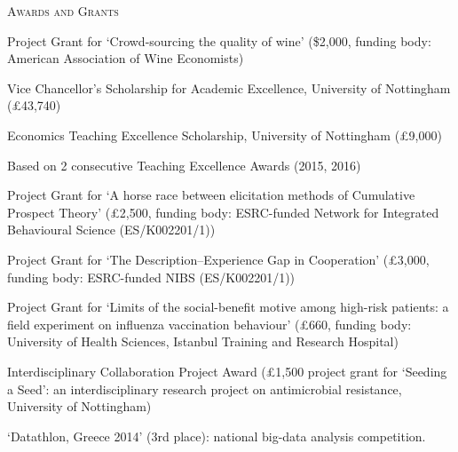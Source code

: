 \begin{rubric}{\textsc{Awards and Grants}}


\entry*[2022]%
Project Grant for `Crowd-sourcing the quality of wine' (\$2,000, funding body: American Association of Wine Economists)


\entry*[2014 -- 2017]%
	Vice Chancellor's Scholarship for Academic Excellence, University of Nottingham (\pounds43,740)

\entry*[2017]	Economics Teaching Excellence Scholarship, University of Nottingham (\pounds9,000)
			\par Based on 2 consecutive Teaching Excellence Awards (2015, 2016)	

\entry*[2017] Project Grant for `A horse race between elicitation methods of Cumulative Prospect Theory'
(\pounds2,500, funding body: ESRC-funded Network for Integrated Behavioural Science (ES/K002201/1)) 

\entry*[2016] Project Grant for `The Description--Experience Gap in Cooperation' 
(\pounds3,000, funding body: ESRC-funded NIBS (ES/K002201/1))

\entry*[2016] Project Grant for `Limits of the social-benefit motive among high-risk patients: a field 
experiment on influenza vaccination behaviour' (\pounds660, funding body: University of Health Sciences, Istanbul Training and Research Hospital)

\entry*[2015] Interdisciplinary Collaboration Project Award 
(\pounds1,500 project grant for `Seeding a Seed': an interdisciplinary research project on antimicrobial resistance, University of Nottingham)

\entry*[2014]	`Datathlon, Greece 2014' (3rd place): national big-data analysis competition.

\end{rubric}
